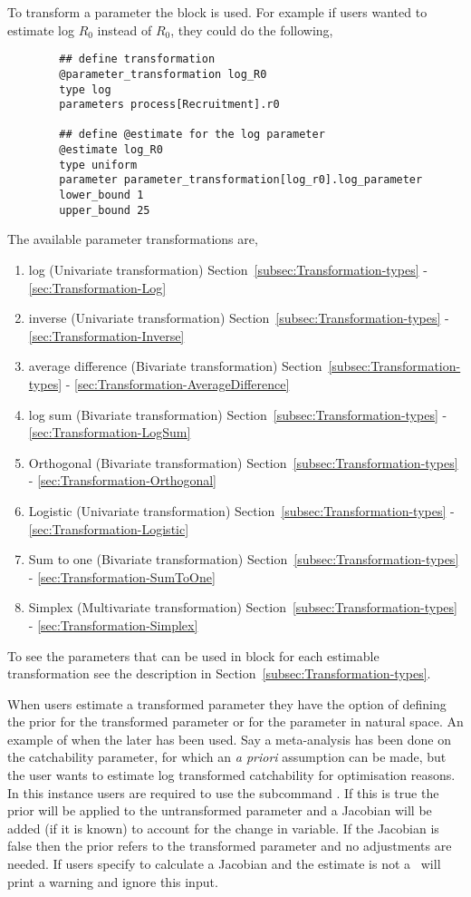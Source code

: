 To transform a parameter the  block is used. For example if users wanted to estimate log \(R_0\) instead of \(R_0\), they could do the following,
{\small{\begin{verbatim}
		## define transformation
		@parameter_transformation log_R0
		type log
		parameters process[Recruitment].r0

		## define @estimate for the log parameter
		@estimate log_R0
		type uniform
		parameter parameter_transformation[log_r0].log_parameter
		lower_bound 1
		upper_bound 25
\end{verbatim}}}
%
The available parameter transformations are,
\begin{enumerate}
	\item log (Univariate transformation) Section~\ref{subsec:Transformation-types} - \ref{sec:Transformation-Log}
	\item inverse (Univariate transformation) Section~\ref{subsec:Transformation-types} - \ref{sec:Transformation-Inverse}
	\item average difference (Bivariate transformation) Section~\ref{subsec:Transformation-types} - \ref{sec:Transformation-AverageDifference}
	\item log sum (Bivariate transformation) Section~\ref{subsec:Transformation-types} - \ref{sec:Transformation-LogSum}	
	\item Orthogonal (Bivariate transformation) Section~\ref{subsec:Transformation-types} - \ref{sec:Transformation-Orthogonal}
	\item Logistic (Univariate transformation) Section~\ref{subsec:Transformation-types} - \ref{sec:Transformation-Logistic}
	\item Sum to one (Bivariate transformation) Section~\ref{subsec:Transformation-types} - \ref{sec:Transformation-SumToOne}
	\item Simplex (Multivariate transformation) Section~\ref{subsec:Transformation-types} - \ref{sec:Transformation-Simplex}	
\end{enumerate}

To see the parameters that can be used in  block for each estimable transformation see the  description in Section~\ref{subsec:Transformation-types}.

When users estimate a transformed parameter they have the option of defining the prior for the transformed parameter or for the parameter in natural space. An example of when the later has been used. Say a meta-analysis has been done on the catchability parameter, for which an \textit{a priori} assumption can be made, but the user wants to estimate log transformed catchability for optimisation reasons. In this instance users are required to use the subcommand . If this is true the prior will be applied to the untransformed parameter and a Jacobian will be added (if it is known) to account for the change in variable. If the Jacobian is false then the prior refers to the transformed parameter and no adjustments are needed. If users specify to calculate a Jacobian and the estimate is not a  \CNAME\ will print a warning and ignore this input.

